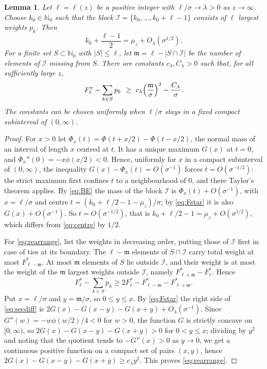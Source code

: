 \documentclass[11pt,a4paper]{article}
\numberwithin{equation}{section}
\theoremstyle{plain}
\newtheorem{lemma}[theorem]{Lemma}
\theoremstyle{definition}
\theoremstyle{remark}
\newcommand{\N}{\mathbb{N}}
\newcommand{\cI}{\mathcal{I}}
\newcommand{\fm}{\mathfrak{m}}
\begin{document}
\begin{lemma}\label{lem:rearrange}
Let $\ell=\ell(z)$ be a positive integer with $\ell/\sigma\to\lambda>0$ as $z\to\infty$. Choose $k_0\in\N_0$ such that the block $\cI=\{k_0,\dots,k_0+\ell-1\}$ consists of $\ell$ largest weights $p_k$. Then
\begin{equation}\label{eq:centre}
k_0+\frac{\ell-1}{2}=\mu_z+O_\lambda(\sigma^{1/2}).
\end{equation}
For a finite set $S\subset\N_0$ with $|S|\le\ell$, let $\fm=\ell-|S\cap\cI|$ be the number of elements of $\cI$ missing from $S$. There are constants $c_\lambda,C_\lambda>0$ such that, for all sufficiently large $z$,
\begin{equation}\label{eq:rearrange}
F^*_\ell-\sum_{k\in S}p_k\ \ge\ c_\lambda\Bigl(\frac{\fm}{\sigma}\Bigr)^2-\frac{C_\lambda}{\sigma}.
\end{equation}
The constants can be chosen uniformly when $\ell/\sigma$ stays in a fixed compact subinterval of $(0,\infty)$.
\end{lemma}

\begin{proof}
For $x>0$ let $\Phi_x(t)=\Phi(t+x/2)-\Phi(t-x/2)$, the normal mass of an interval of length $x$ centred at $t$. It has a unique maximum $G(x)$ at $t=0$, and $\Phi_x''(0)=-x\phi(x/2)<0$. Hence, uniformly for $x$ in a compact subinterval of $(0,\infty)$, the inequality $G(x)-\Phi_x(t)=O(\sigma^{-1})$ forces $t=O(\sigma^{-1/2})$: the strict maximum first confines $t$ to a neighbourhood of $0$, and there Taylor's theorem applies. By \eqref{eq:BE} the mass of the block $\cI$ is $\Phi_x(t)+O(\sigma^{-1})$, with $x=\ell/\sigma$ and centre $t=(k_0+\ell/2-1-\mu_z)/\sigma$; by \eqref{eq:Fstar} it is also $G(x)+O(\sigma^{-1})$. So $t=O(\sigma^{-1/2})$, that is $k_0+\ell/2-1=\mu_z+O(\sigma^{1/2})$, which differs from \eqref{eq:centre} by $1/2$.

For \eqref{eq:rearrange}, list the weights in decreasing order, putting those of $\cI$ first in case of ties at its boundary. The $\ell-\fm$ elements of $S\cap\cI$ carry total weight at most $F^*_{\ell-\fm}$. At most $\fm$ elements of $S$ lie outside $\cI$, and their weight is at most the weight of the $\fm$ largest weights outside $\cI$, namely $F^*_{\ell+\fm}-F^*_\ell$. Hence
\begin{equation}\label{eq:secdiff}
F^*_\ell-\sum_{k\in S}p_k\ge2F^*_\ell-F^*_{\ell-\fm}-F^*_{\ell+\fm}.
\end{equation}
Put $x=\ell/\sigma$ and $y=\fm/\sigma$, so $0\le y\le x$. By \eqref{eq:Fstar} the right side of \eqref{eq:secdiff} is $2G(x)-G(x-y)-G(x+y)+O_\lambda(\sigma^{-1})$. Since $G''(w)=-w\phi(w/2)/4<0$ for $w>0$, the function $G$ is strictly concave on $[0,\infty)$, so $2G(x)-G(x-y)-G(x+y)>0$ for $0<y\le x$; dividing by $y^2$ and noting that the quotient tends to $-G''(x)>0$ as $y\to0$, we get a continuous positive function on a compact set of pairs $(x,y)$, hence $2G(x)-G(x-y)-G(x+y)\ge c_\lambda y^2$. This proves \eqref{eq:rearrange}.
\end{proof}
\end{document}
